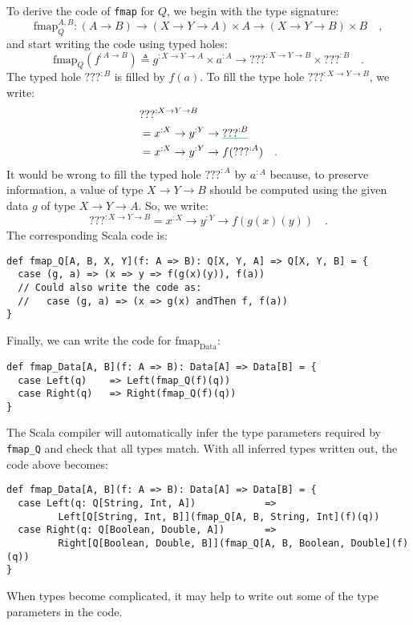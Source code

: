 To derive the code of \lstinline!fmap! for $Q$, we begin with the
type signature:
\[
\text{fmap}_{Q}^{A,B}:\left(A\rightarrow B\right)\rightarrow\left(X\rightarrow Y\rightarrow A\right)\times A\rightarrow\left(X\rightarrow Y\rightarrow B\right)\times B\quad,
\]
and start writing the code using typed holes:
\[
\text{fmap}_{Q}(f^{:A\rightarrow B})\triangleq g^{:X\rightarrow Y\rightarrow A}\times a^{:A}\rightarrow\text{???}^{:X\rightarrow Y\rightarrow B}\times\text{???}^{:B}\quad.
\]
The typed hole $\text{???}^{:B}$ is filled by $f(a)$. To fill the
type hole $\text{???}^{:X\rightarrow Y\rightarrow B}$, we write:
\begin{align*}
 & \text{???}^{:X\rightarrow Y\rightarrow B}\\
 & =x^{:X}\rightarrow y^{:Y}\rightarrow\gunderline{\text{???}^{:B}}\\
 & =x^{:X}\rightarrow y^{:Y}\rightarrow f(\text{???}^{:A})\quad.
\end{align*}
It would be wrong to fill the typed hole $\text{???}^{:A}$ by $a^{:A}$
because, to preserve information, a value of type $X\rightarrow Y\rightarrow B$
should be computed using the given data $g$ of type $X\rightarrow Y\rightarrow A$.
So, we write:
\[
\text{???}^{:X\rightarrow Y\rightarrow B}=x^{:X}\rightarrow y^{:Y}\rightarrow f(g(x)(y))\quad.
\]
The corresponding Scala code is:
\begin{lstlisting}
def fmap_Q[A, B, X, Y](f: A => B): Q[X, Y, A] => Q[X, Y, B] = {
  case (g, a) => (x => y => f(g(x)(y)), f(a))
  // Could also write the code as:
  //   case (g, a) => (x => g(x) andThen f, f(a))
}
\end{lstlisting}
Finally, we can write the code for $\text{fmap}_{\text{Data}}$:
\begin{lstlisting}
def fmap_Data[A, B](f: A => B): Data[A] => Data[B] = {
  case Left(q)    => Left(fmap_Q(f)(q))
  case Right(q)   => Right(fmap_Q(f)(q))
}
\end{lstlisting}
The Scala compiler will automatically infer the type parameters required
by \lstinline!fmap_Q! and check that all types match. With all inferred
types written out, the code above becomes:
\begin{lstlisting}
def fmap_Data[A, B](f: A => B): Data[A] => Data[B] = {
  case Left(q: Q[String, Int, A])            =>
         Left[Q[String, Int, B]](fmap_Q[A, B, String, Int](f)(q))
  case Right(q: Q[Boolean, Double, A])       =>
         Right[Q[Boolean, Double, B]](fmap_Q[A, B, Boolean, Double](f)(q))
}
\end{lstlisting}
When types become complicated, it may help to write out some of the
type parameters in the code.

